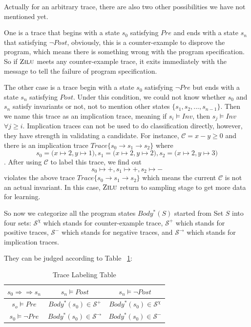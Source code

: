 Actually for an arbitrary trace, there are also two other possibilities we have not mentioned yet.

One is a trace that begins with a state $s_0$ satisfying $Pre$ and ends with a state $s_n$ that satisfying $\neg Post$,
obviously, this is a counter-example to disprove the program,
which means there is something wrong with the program specification.
So if $\textsc{Zilu}$ meets any counter-example trace, 
it exits immediately with the message to tell the failure of program specification. 

The other case is a trace begin with a state $s_0$ satisfying $\neg Pre$ but ends with a state $s_n$ satisfying $Post$.
Under this condition, we could not know whether $s_0$ and $s_n$ satisfy invariants or not,
not to mention other states $\{s_1, s_2, ..., s_{n-1}\}$.
Then we name this trace as an implication trace, meaning if $s_i \models Inv$, then $s_j \models Inv$ $\forall j \ge i$.
Implication traces can not be used to do classification directly, 
however, they have strength in validating a candidate.
For instance, $\mathcal{C} = x - y \ge 0$ and there is an implication trace 
$Trace\{s_0 \to s_1 \to s_2\}$ where 
$$s_0 = \big(x \mapsto 2, y \mapsto 1\big),  s_1 = \big(x \mapsto 2, y \mapsto 2\big),  s_2 = \big(x \mapsto 2, y \mapsto 3\big)$$.
After using $\mathcal{C}$ to label this trace, we find out $$s_0 \mapsto +,  s_1 \mapsto +,  s_2 \mapsto -$$ 
violates the above trace $Trace\{s_0 \to s_1 \to s_2\}$ which means the current $\mathcal{C}$ is not an actual invariant.
In this case, $\textsc{Zilu}$ return to sampling stage to get more data for learning.


So now we categorize all the program states $Body^*(S)$ started from Set $S$ into four sets:
$\mathcal{S}^\chi$ which stands for counter-example trace, 
$\mathcal{S}^+$ which stands for positive traces, 
$\mathcal{S}^-$ which stands for negative traces, 
and $\mathcal{S}^\rightarrow$ which stands for implication traces.

They can be judged according to Table ~\ref{tab:labeling}: 
\begin{table}[htb]
\label{tab:labeling}
\centering
\caption{Trace Labeling Table}
\begin{tabular}[float]{|c|c|c|}
\hline
$s_0 \Rightarrow \Rightarrow s_n$ & $s_n \models Post$            & $s_n \models \neg Post$\\
\hline
$s_o \models Pre$                 & $Body^*(s_0) \in \mathcal{S}^+$       & $Body^*(s_0) \in \mathcal{S}^\chi$\\
\hline
$s_0 \models \neg Pre$            & $Body^*(s_0) \in \mathcal{S}^\rightarrow$       & $Body^*(s_0) \in \mathcal{S}^-$\\
\hline
\end{tabular}
\end{table}

